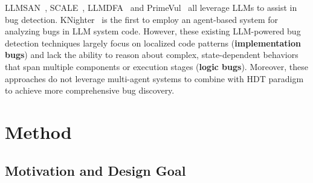 \documentclass{article}
\theoremstyle{plain}
\theoremstyle{definition}
\theoremstyle{remark}
\newcommand{\consensustester}{Agora\xspace}
\begin{document}
LLMSAN~\cite{Wang2024SanitizingLL}, SCALE~\cite{Wen2024SCALECS}, LLMDFA~\cite{Wang2024LLMDFAAD} and PrimeVul~\cite{Ding2025VulnerabilityDW} all leverage LLMs to assist in bug detection. KNighter~\cite{Yang2025KNighterTS} is the first to employ an agent-based system for analyzing bugs in LLM system code.
However, these existing LLM-powered bug detection techniques largely focus on localized code patterns (\textbf{implementation bugs}) and lack the ability to reason about complex, state-dependent behaviors that span multiple components or execution stages (\textbf{logic bugs}). Moreover, these approaches do not leverage multi-agent systems to combine with HDT paradigm to achieve more comprehensive bug discovery.



\section{Method}
\label{sec:method}




\subsection{Motivation and Design Goal}
\label{sec:goal}

\end{document}

